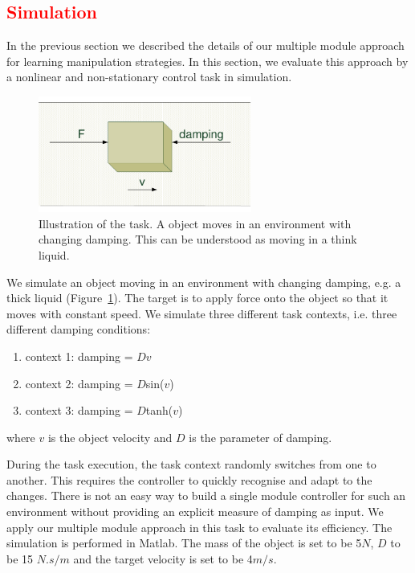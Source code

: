 \textcolor{red}{\section{Simulation}}
\label{sec:diss}

In the previous section we described the details of our multiple module approach for learning manipulation strategies. In this section, we evaluate this approach by a nonlinear and non-stationary control task in simulation.

\begin{figure}
  \centering
  \includegraphics[width=7cm]{./fig/simulation.pdf}
  \caption{ \scriptsize{Illustration of the task. A object moves in an environment with changing damping. This can be understood as moving in a think liquid.}
}
\label{fig:simulation}
\end{figure}

We simulate an object moving in an environment with changing damping, e.g. a thick liquid (Figure~\ref{fig:simulation}). The target is to apply force onto the object so that it moves with constant speed. We simulate three different task contexts, i.e. three different damping conditions:

\begin{enumerate}
\item context 1: damping = $D$$v$
\item context 2: damping = $D$sin($v$)
\item context 3: damping = $D$tanh($v$)
\end{enumerate}
where $v$ is the object velocity and $D$ is the parameter of damping.

During the task execution, the task context randomly switches from one to another. This requires the controller to quickly recognise and adapt to the changes. There is not an easy way to build a single module controller for such an environment without providing an explicit measure of damping as input. We apply our multiple module approach in this task to evaluate its efficiency. The simulation is performed in Matlab.
The mass of the object is set to be 5$N$, $D$ to be 15 $N.s/m$ and the target velocity is set to be 4$m/s$.

